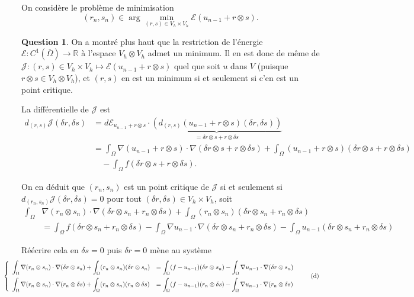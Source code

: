 \documentclass[11pt]{article}
\newcommand{\RR}{\mathbb{R}}
\theoremstyle{definition}
\newtheorem{ques}{Question}
\theoremstyle{plain}
\begin{document}
On considère le problème de minimisation
\begin{equation}\label{eq:5}
(r_n,s_n) \in \arg\min_{(r,s)\in V_h\times V_h} \mathcal{E}(u_{n-1}+r\otimes s).
\end{equation}


\begin{ques}
On a montré plus haut que la restriction de l'énergie $\mathcal{E}:C^1(\overline{\Omega})\longrightarrow \RR$ à l'espace $V_h\otimes V_h$ admet un minimum. Il en est donc de même de $\mathcal J:(r,s)\in V_h\times V_h\longmapsto \mathcal{E}(u_{n-1} + r\otimes s)$ quel que soit $u$ dans $V$ (puisque $r\otimes s\in V_h\otimes V_h$), et $(r,s)$ en est un minimum si et seulement si c'en est un point critique.

La différentielle de $\mathcal{J}$ est
\begin{align*}
d_{(r,s)}\mathcal J(\delta r,\delta s) 
&= d\mathcal{E}_{u_{n-1}+r\otimes s}\cdot
\underbrace{\left(
d_{(r,s)}(u_{n-1}+r\otimes s)(\delta r,\delta s)\right)
}_{= \delta r\otimes s + r\otimes\delta s} \\
&= \int_\Omega \nabla(u_{n-1}+r\otimes s)\cdot\nabla(\delta r\otimes s + r\otimes\delta s)
+ \int_\Omega (u_{n-1}+r\otimes s)(\delta r\otimes s + r\otimes\delta s)
\\ &\quad - \int_\Omega f(\delta r\otimes s + r\otimes\delta s).
\end{align*}

On en déduit que $(r_n,s_n)$ est un point critique de $\mathcal{J}$ si et seulement si $d_{(r_n,s_n)}\mathcal{J}(\delta r,\delta s) = 0$ pour tout $(\delta r,\delta s)\in V_h\times V_h$, soit
\begin{align}\label{eq:6}
\int_\Omega &\nabla(r_n\otimes s_n)\cdot\nabla(\delta r\otimes s_n + r_n\otimes \delta s) + \int_\Omega (r_n\otimes s_n)(\delta r\otimes s_n + r_n\otimes \delta s) \nonumber \\
&=\int_\Omega f(\delta r\otimes s_n + r_n\otimes\delta s) - \int_\Omega \nabla u_{n-1}\cdot\nabla(\delta r\otimes s_n + r_n\otimes\delta s) - \int_\Omega u_{n-1}(\delta r\otimes s_n + r_n\otimes\delta s)
\end{align}

Réécrire cela en $\delta s=0$ puis $\delta r=0$ mène au système 
\begin{equation}\hspace*{-1cm}
\left\{
\begin{array}{*2{>{\displaystyle}l}}
\int_\Omega \nabla(r_n\otimes s_n)\cdot\nabla(\delta r\otimes s_n) + \int_\Omega (r_n\otimes s_n)(\delta r\otimes s_n) 
&= \int_\Omega (f-u_{n-1})(\delta r\otimes s_n) - \int_\Omega \nabla u_{n-1}\cdot\nabla(\delta r\otimes s_n) \\[1em]
\int_\Omega \nabla(r_n\otimes s_n)\cdot\nabla(r_n\otimes\delta s) + \int_\Omega (r_n\otimes s_n)(r_n\otimes\delta s) 
&= \int_\Omega (f-u_{n-1})(r_n\otimes \delta s) - \int_\Omega \nabla u_{n-1}\cdot\nabla(r_n\otimes\delta s)
\end{array}\right.\tag{d}\label{eq:d}
\end{equation}


\end{ques}
\end{document}
